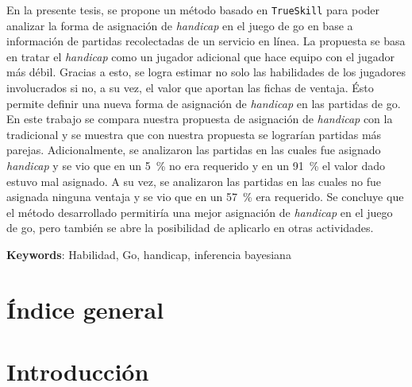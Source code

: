 \documentclass[11pt,twoside, spanish]{report} %
\begin{document}
En la presente tesis, se propone un m\'etodo basado en \texttt{TrueSkill} para poder analizar la forma de asignaci\'on de \emph{handicap} en el juego de go en base a informaci\'on de partidas recolectadas de un servicio en l\'inea.
La propuesta se basa en tratar el \emph{handicap} como un jugador adicional que hace equipo con el jugador m\'as d\'ebil. 
Gracias a esto, se logra estimar no solo las habilidades de los jugadores involucrados si no, a su vez, el valor que aportan las fichas de ventaja.
\'Esto permite definir una nueva forma de asignaci\'on de \emph{handicap} en las partidas de go.
En este trabajo se compara nuestra propuesta de asignaci\'on de \emph{handicap} con la tradicional y se muestra que con nuestra propuesta se lograr\'ian partidas m\'as parejas.
Adicionalmente, se analizaron las partidas en las cuales fue asignado \emph{handicap} y se vio que en un \SI{5}{\percent} no era requerido  y en un \SI{91}{\percent} el valor dado estuvo mal asignado.
A su vez, se analizaron las partidas en las cuales no fue asignada ninguna ventaja y se vio que en un \SI{57}{\percent} era requerido. 
Se concluye que el m\'etodo desarrollado permitir\'ia una mejor asignaci\'on de \emph{handicap} en el juego de go, pero tambi\'en se abre la posibilidad de aplicarlo en otras actividades.

\textbf{Keywords}: Habilidad, Go, handicap, inferencia bayesiana



\newpage
\chapter*{\'Indice general} %
\pagestyle{empty}
\thispagestyle{empty}
\vspace*{-5cm}
\tableofcontents
\thispagestyle{empty}


\cleardoublepage
\thispagestyle{plain}
\pagestyle{plain}
\setcounter{page}{1}
\chapter{Introducci\'on}
\end{document}
